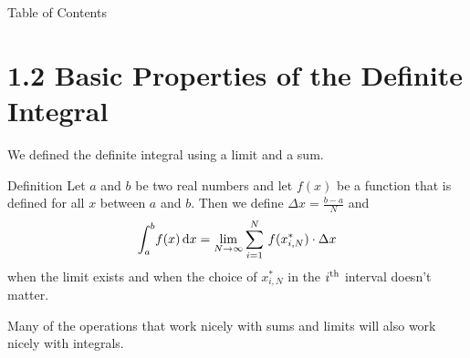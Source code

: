 

 \begin{frame}{Table of Contents }
\mapofcontentsA{\ab,\aintro}
 \end{frame}


\section[1.2 Basic Properties]{1.2 Basic Properties of the Definite Integral}
\begin{frame}
We defined the definite integral using a limit and a sum.
\vfill
\begin{block}{Definition}
Let $a$ and $b$ be two real numbers and let $f(x)$ be a function that is defined for all $x$ between $a$ and $b$. Then we define $\Delta x = \frac{b-a}{N}$ and
\[{\int_a^b} f(x) \,\text{d} x = \lim_{N \to \infty} \sum_{i=1}^N\, f({x_{i,N}^*})\cdot \Delta x\]
when the limit exists and when the choice of $x_{i,N}^*$ in the $i^{\rm th}$ interval doesn't matter. 
\end{block}
\vfill
Many of the operations that work nicely with sums and limits will also work nicely with integrals.
\end{frame}

